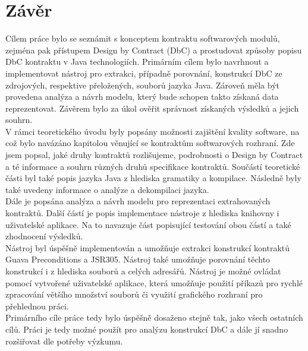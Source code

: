 \chapter{Závěr}	
	Cílem práce bylo se seznámit s konceptem kontraktu softwarových modulů, zejména pak přístupem Design by Contract (DbC) a prostudovat způsoby popisu DbC kontraktu v Java technologiích. Primárním cílem bylo navrhnout a implementovat nástroj pro extrakci, případně porovnání, konstrukcí DbC ze zdrojových, respektive přeložených, souborů jazyka Java. Zároveň měla být provedena analýza a návrh modelu, který bude schopen takto získaná data reprezentovat. Závěrem bylo za úkol ověřit správnost získaných výsledků a jejich souhrn.\\
	
	V rámci teoretického úvodu byly popsány možnosti zajištění kvality software, na což bylo navázáno kapitolou věnující se kontraktům softwarových rozhraní. Zde jsem popsal, jaké druhy kontraktů rozlišujeme, podrobnosti o Design by Contract a té informace a souhrn různých druhů specifikace kontraktů. Součástí teoretické části byl také popis jazyka Java z hlediska gramatiky a kompilace. Následně byly také uvedeny informace o analýze a dekompilaci jazyka.\\
	
	Dále je popsána analýza a návrh modelu pro reprezentaci extrahovaných kontraktů. Další částí je popis implementace nástroje z hlediska knihovny i uživatelské aplikace. Na to navazuje část popisující testování obou částí a také zhodnocení výsledků.\\
	
	Nástroj byl úspěšně implementován a umožňuje extrakci konstrukcí kontraktů Guava Preconditions a JSR305. Nástroj také umožňuje porovnání těchto konstrukcí i z hlediska souborů a celých adresářů. Nástroj je možné ovládat pomocí vytvořené uživatelské aplikace, která umožňuje použití příkazů pro rychlé zpracování většího množství souborů či využití grafického rozhraní pro přehlednou práci.\\
	
	Primárního cíle práce tedy bylo úspěšně dosaženo stejně tak, jako všech ostatních cílů. Práci je tedy možné použít pro analýzu konstrukcí DbC a dále jí snadno rozšiřovat dle potřeby výzkumu.
